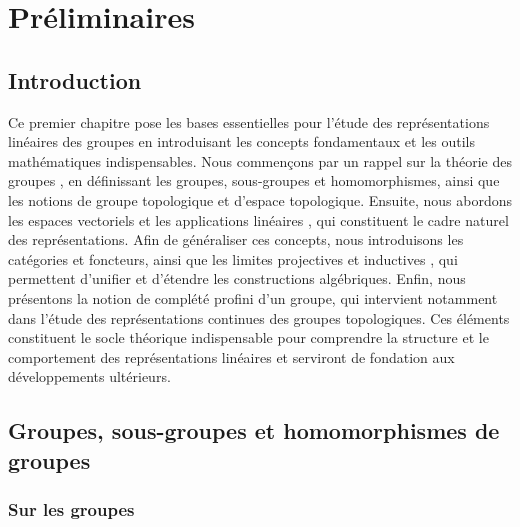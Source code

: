 \documentclass[a4paper, 14pt]{report}
\newcommand{\applyfontsize}{%
	\fontsize{12}{12}\selectfont
}
\begin{document}
\begin{onehalfspace}
{		}
		
		
		
		
		\chapter{Préliminaires}
		
		{
			\applyfontsize %
			
			\section*{Introduction}
			
			Ce premier chapitre pose les bases essentielles pour l’étude des représentations linéaires des groupes en introduisant les concepts fondamentaux et les outils mathématiques indispensables. Nous commençons par un rappel sur la théorie des groupes \cite{schaub1997}, en définissant les groupes, sous-groupes et homomorphismes, ainsi que les notions de groupe topologique et d’espace topologique. Ensuite, nous abordons les espaces vectoriels et les applications linéaires \cite{lang2012algebra}, qui constituent le cadre naturel des représentations. Afin de généraliser ces concepts, nous introduisons les catégories et foncteurs, ainsi que les limites projectives et inductives \cite{maclane1971categories}, qui permettent d’unifier et d’étendre les constructions algébriques. Enfin, nous présentons la notion de complété profini d’un groupe, qui intervient notamment dans l’étude des représentations continues des groupes topologiques. Ces éléments constituent le socle théorique indispensable pour comprendre la structure et le comportement des représentations linéaires et serviront de fondation aux développements ultérieurs.
			
			\section{Groupes, sous-groupes et homomorphismes de groupes}
			\subsection{Sur les groupes}
			
}
\end{onehalfspace}
\end{document}
